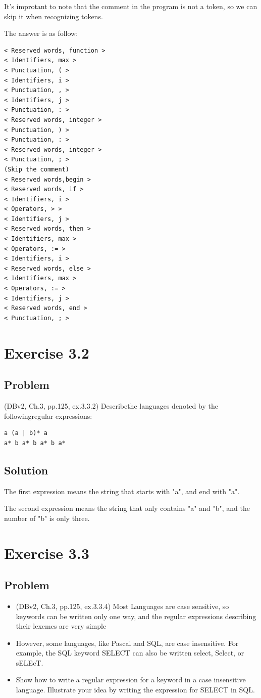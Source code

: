 It's improtant to note that the comment in the program is not a token, so we can skip it when recognizing tokens.

The answer is as follow:

\begin{lstlisting}[style=cleancpp]
< Reserved words, function >
< Identifiers, max >
< Punctuation, ( >
< Identifiers, i >
< Punctuation, , >
< Identifiers, j >
< Punctuation, : >
< Reserved words, integer >
< Punctuation, ) >
< Punctuation, : >
< Reserved words, integer >
< Punctuation, ; >
(Skip the comment)
< Reserved words,begin >
< Reserved words, if >
< Identifiers, i >
< Operators, > >
< Identifiers, j >
< Reserved words, then >
< Identifiers, max >
< Operators, := >
< Identifiers, i >
< Reserved words, else >
< Identifiers, max >
< Operators, := >
< Identifiers, j >
< Reserved words, end >
< Punctuation, ; >
\end{lstlisting}


\chapter{Exercise 3.2}
\section{Problem}

(DBv2, Ch.3, pp.125, ex.3.3.2) 
Describethe languages denoted by the followingregular expressions:
\begin{lstlisting}[style=cleancpp]
a (a | b)* a
a* b a* b a* b a*
\end{lstlisting}

\section{Solution}

The first expression means the string that starts with "a", and end with "a".

The second expression means the string that only contains "a" and "b", and the number of "b" is only three.


\chapter{Exercise 3.3}
\section{Problem}

\begin{itemize}
	\item (DBv2, Ch.3, pp.125, ex.3.3.4) Most Languages are case sensitive, so keywords
		can be written only one way, and the regular expressions describing their
		lexemes are very simple
	\item However, some languages, like Pascal and SQL, are case insensitive. For example, the
		SQL keyword SELECT can also be written select, Select, or sELEcT.
	\item Show how to write a regular expression for a keyword in a case insensitive language.
		Illustrate your idea by writing the expression for SELECT in SQL.
\end{itemize}

